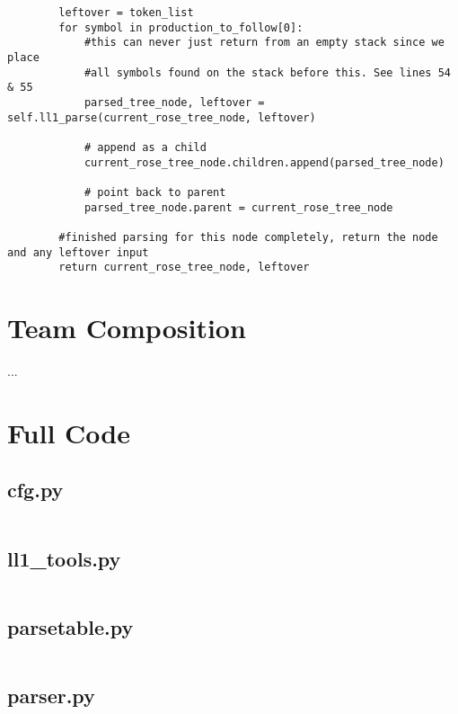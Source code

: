\documentclass{article}
\begin{document}
\begin{verbatim}
        leftover = token_list
        for symbol in production_to_follow[0]:
            #this can never just return from an empty stack since we place
            #all symbols found on the stack before this. See lines 54 & 55
            parsed_tree_node, leftover = self.ll1_parse(current_rose_tree_node, leftover)

            # append as a child
            current_rose_tree_node.children.append(parsed_tree_node)

            # point back to parent
            parsed_tree_node.parent = current_rose_tree_node

        #finished parsing for this node completely, return the node and any leftover input
        return current_rose_tree_node, leftover
\end{verbatim}

\section{Team Composition}
...

\section{Full Code}
\label{code}

\subsection{cfg.py}
\label{code:cfg}
\inputminted{python}{./cfg.py}
\newpage

\subsection{ll1\_tools.py}
\label{code:ll1_tools}
\inputminted{python}{./ll1_tools.py}
\newpage

\subsection{parsetable.py}
\label{code:parsetable}
\inputminted{python}{./parsetable.py}
\newpage

\subsection{parser.py}
\label{code:parser}
\inputminted{python}{./parser.py}
\end{document}
